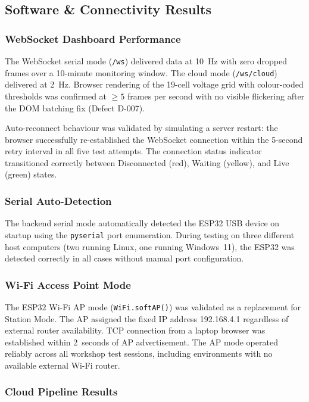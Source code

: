 \subsection{Software \& Connectivity Results}

\subsubsection{WebSocket Dashboard Performance}

The WebSocket serial mode (\texttt{/ws}) delivered data at 10~Hz with zero dropped frames over a 10-minute monitoring window. The cloud mode (\texttt{/ws/cloud}) delivered at 2~Hz. Browser rendering of the 19-cell voltage grid with colour-coded thresholds was confirmed at $\geq 5$ frames per second with no visible flickering after the DOM batching fix (Defect D-007).

Auto-reconnect behaviour was validated by simulating a server restart: the browser successfully re-established the WebSocket connection within the 5-second retry interval in all five test attempts. The connection status indicator transitioned correctly between Disconnected (red), Waiting (yellow), and Live (green) states.

\subsubsection{Serial Auto-Detection}

The backend serial mode automatically detected the ESP32 USB device on startup using the \texttt{pyserial} port enumeration. During testing on three different host computers (two running Linux, one running Windows~11), the ESP32 was detected correctly in all cases without manual port configuration.

\subsubsection{Wi-Fi Access Point Mode}

The ESP32 Wi-Fi AP mode (\texttt{WiFi.softAP()}) was validated as a replacement for Station Mode. The AP assigned the fixed IP address 192.168.4.1 regardless of external router availability. TCP connection from a laptop browser was established within 2~seconds of AP advertisement. The AP mode operated reliably across all workshop test sessions, including environments with no available external Wi-Fi router.

\subsubsection{Cloud Pipeline Results}

